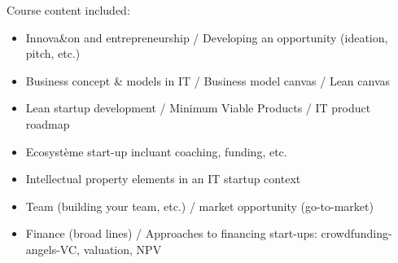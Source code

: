 Course content included:
\begin{itemize}
    \item Innova\&on and entrepreneurship / Developing an opportunity (ideation, pitch, etc.)
    \item Business concept \& models in IT / Business model canvas / Lean canvas
    \item Lean startup development / Minimum Viable Products / IT product roadmap
    \item Ecosystème start-up incluant coaching, funding, etc.
    \item Intellectual property elements in an IT startup context
    \item Team (building your team, etc.) / market opportunity (go-to-market)
    \item Finance (broad lines) / Approaches to financing start-ups: crowdfunding- angels-VC, valuation, NPV
\end{itemize}
